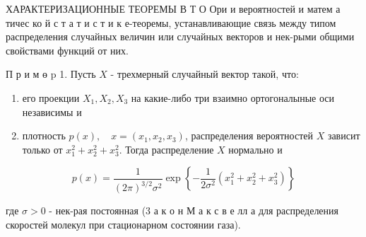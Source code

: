 \documentclass[10pt]{article}
\begin{document}
ХАРАКТЕРИЗАЦИОННЫЕ ТЕОРЕМЫ В Т О Ори и вероятностей и матем а тичес ко й с т а т и с т и к е-теоремы, устанавливающие связь между типом распределения случайных величин или случайных векторов и нек-рыми общими свойствами функций от них.



П р и м ө $\mathrm{p}$ 1. Пусть $X$ - трехмерный случайный вектор такой, что:



\begin{enumerate}

  \item его проекции $X_{1}, X_{2}, X_{3}$ на какие-либо три взаимно ортогоналыные оси независимы и



  \item плотность $p(x), \quad x=\left(x_{1}, x_{2}, x_{3}\right)$, распределения вероятностей $X$ зависит только от $x_{1}^{2}+x_{2}^{2}+x_{3}^{2}$. Тогда распределение $X$ нормально и



\end{enumerate}



\[

p(x)=\frac{1}{(2 \pi)^{3 / 2} \sigma^{2}} \exp \left\{-\frac{1}{2 \sigma^{2}}\left(x_{1}^{2}+x_{2}^{2}+x_{3}^{2}\right)\right\}

\]



где $\sigma>0$ - нек-рая постоянная (3 а к о н М а к с в е лл а для распределения скоростей молекул при стационарном состоянии газа).
\end{document}

